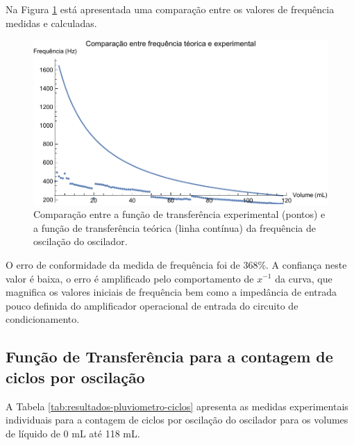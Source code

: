 \documentclass[a4paper]{instrumentacao}
\begin{document}
Na Figura \ref{fig:resultados-pluviometro-frequencia-comparacao} está apresentada uma comparação entre os valores de frequência medidas e calculadas.

\begin{figure}[H]
	\centering \includegraphics[width=\textwidth]{Nivel/Experimental/Frequencia-Comparacao.pdf}
	\caption{Comparação entre a função de transferência experimental (pontos) e a função de transferência teórica (linha contínua) da frequência de oscilação do oscilador.}
	\label{fig:resultados-pluviometro-frequencia-comparacao}
\end{figure}

O erro de conformidade da medida de frequência foi de 368\%. A confiança neste valor é baixa, o erro é amplificado pelo comportamento de $x^{-1}$ da curva, que magnifica os valores iniciais de frequência bem como a impedância de entrada pouco definida do amplificador operacional de entrada do circuito de condicionamento.

\subsection{Função de Transferência para a contagem de ciclos por oscilação}

A Tabela \ref{tab:resultados-pluviometro-ciclos} apresenta as medidas experimentais individuais para a contagem de ciclos por oscilação do oscilador para os volumes de líquido de 0 mL até 118 mL.
\end{document}
